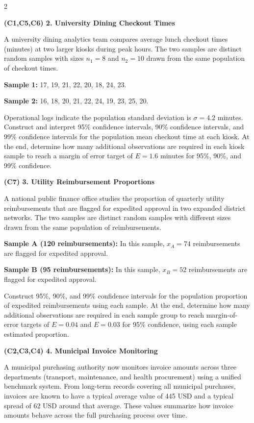 \documentclass[12pt]{article}
\newcommand{\SubsectionBox}[1]{%
	\noindent\colorbox{gray!30}{%
		\parbox{\linewidth}{\textbf{#1}}%
	}\par\vspace{0.35cm}%
}
\begin{document}
\begin{multicols}{2}
		\vspace{0.25cm}
		\SubsectionBox{(C1,C5,C6) 2. University Dining Checkout Times}\vspace{-0.25cm}
		A university dining analytics team compares average lunch checkout times (minutes) at two larger kiosks during peak hours.
		The two samples are distinct random samples with sizes $n_1 = 8$ and $n_2 = 10$ drawn from the same population of checkout times.

		\textbf{Sample 1:} 17, 19, 21, 22, 20, 18, 24, 23.

		\textbf{Sample 2:} 16, 18, 20, 21, 22, 24, 19, 23, 25, 20.

		Operational logs indicate the population standard deviation is $\sigma = 4.2$ minutes.
		Construct and interpret 95\% confidence intervals, 90\% confidence intervals, and 99\% confidence intervals for the population mean checkout time at each kiosk.
		At the end, determine how many additional observations are required in each kiosk sample to reach a margin of error target of $E = 1.6$ minutes for 95\%, 90\%, and 99\% confidence.

		\vspace{0.25cm}
		\SubsectionBox{(C7) 3. Utility Reimbursement Proportions}\vspace{-0.25cm}
		A national public finance office studies the proportion of quarterly utility reimbursements that are flagged for expedited approval in two expanded district networks.
		The two samples are distinct random samples with different sizes drawn from the same population of reimbursements.

		\textbf{Sample A (120 reimbursements):}
		In this sample, $x_A = 74$ reimbursements are flagged for expedited approval.

		\textbf{Sample B (95 reimbursements):}
		In this sample, $x_B = 52$ reimbursements are flagged for expedited approval.

		Construct 95\%, 90\%, and 99\% confidence intervals for the population proportion of expedited reimbursements using each sample.
		At the end, determine how many additional observations are required in each sample group to reach margin-of-error targets of $E = 0.04$ and $E = 0.03$ for 95\% confidence, using each sample estimated proportion.

		\vspace{0.25cm}
		\SubsectionBox{(C2,C3,C4) 4. Municipal Invoice Monitoring}\vspace{-0.25cm}
		A municipal purchasing authority now monitors invoice amounts across three departments (transport, maintenance, and health procurement) using a unified benchmark system. From long-term records covering all municipal purchases, invoices are known to have a typical average value of 445 USD and a typical spread of 62 USD around that average. These values summarize how invoice amounts behave across the full purchasing process over time.


\end{multicols}
\end{document}
